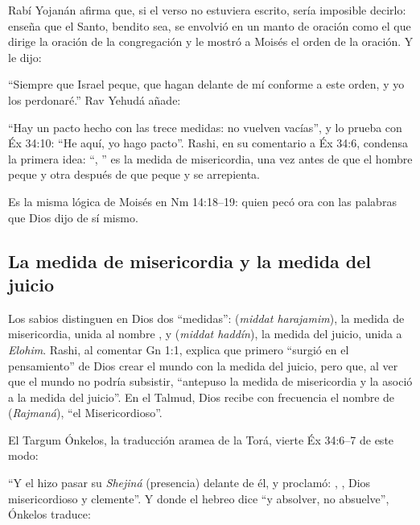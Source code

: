 
Rabí Yojanán afirma que, si el verso no estuviera escrito, sería imposible decirlo: enseña que el Santo, bendito sea, se envolvió en un manto de oración como el que dirige la oración de la congregación y le mostró a Moisés el orden de la oración. Y le dijo:


``Siempre que Israel peque, que hagan delante de mí conforme a este orden, y yo los perdonaré.'' Rav Yehudá añade:


``Hay un pacto hecho con las trece medidas: no vuelven vacías'', y lo prueba con Éx 34:10: ``He aquí, yo hago pacto''. Rashi, en su comentario a Éx 34:6, condensa la primera idea: ``\SENOR, \SENOR'' es la medida de misericordia, una vez antes de que el hombre peque y otra después de que peque y se arrepienta.

Es la misma lógica de Moisés en Nm 14:18--19: quien pecó ora con las palabras que Dios dijo de sí mismo.

\subsection{La medida de misericordia y la medida del juicio}
Los sabios distinguen en Dios dos ``medidas'':  (\emph{middat harajamim}), la medida de misericordia, unida al nombre , y  (\emph{middat haddín}), la medida del juicio, unida a \emph{Elohim}. Rashi, al comentar Gn 1:1, explica que primero ``surgió en el pensamiento'' de Dios crear el mundo con la medida del juicio, pero que, al ver que el mundo no podría subsistir, ``antepuso la medida de misericordia y la asoció a la medida del juicio''. En el Talmud, Dios recibe con frecuencia el nombre de  (\emph{Rajmaná}), ``el Misericordioso''.

El Targum Ónkelos, la traducción aramea de la Torá, vierte Éx 34:6--7 de este modo:


``Y el \SENOR{} hizo pasar su \emph{Shejiná} (presencia) delante de él, y proclamó: \SENOR, \SENOR, Dios misericordioso y clemente''. Y donde el hebreo dice ``y absolver, no absuelve'', Ónkelos traduce:

